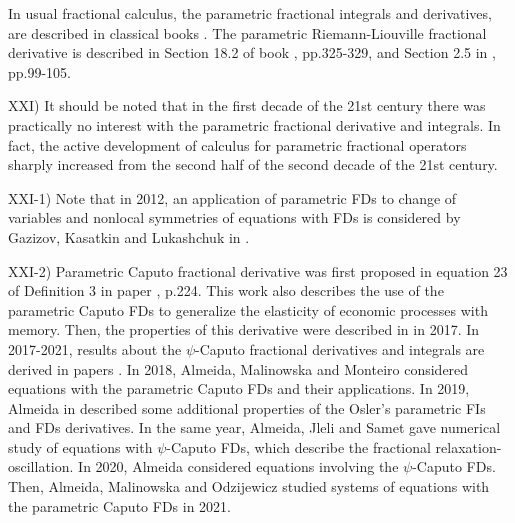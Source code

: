 \documentclass[12pt]{article}
\begin{document}

In usual fractional calculus, the parametric fractional integrals and derivatives, are described in classical books \cite{SKM,KST}.
The parametric Riemann-Liouville fractional derivative is described in Section 18.2 of book \cite{SKM}, pp.325-329, and Section 2.5 in \cite{KST}, pp.99-105.


XXI) It should be noted that in the first decade of the 21st century there was practically no interest with the parametric fractional derivative and integrals. 
In fact, the active development of calculus for parametric fractional operators sharply increased from the second half of the second decade of the 21st century.

XXI-1) Note that in 2012, an application of parametric FDs to change of variables and nonlocal symmetries of equations with FDs is considered by Gazizov, Kasatkin and Lukashchuk in \cite{Gazizov2012}.




XXI-2) Parametric Caputo fractional derivative 
was first proposed in equation 23 of Definition 3 in paper
\cite{Elasticity1}, p.224.
This work also describes the use of the parametric Caputo FDs
to generalize the elasticity of economic processes with memory. 
Then, the properties of this derivative were described in \cite{Almeida-1} in 2017.
In 2017-2021, results about the $\psi$-Caputo fractional derivatives and integrals are derived in papers 
\cite{Almeida-1,Almeida-2,Almeida-3,Almeida-4,Almeida-5,Almeida-6}. 
In 2018, Almeida, Malinowska and Monteiro \cite{Almeida-2} considered equations with the parametric Caputo FDs and their applications. 
In 2019, Almeida in \cite{Almeida-3} described some additional properties of the Osler's parametric FIs and FDs derivatives.
In the same year, Almeida, Jleli and Samet \cite{Almeida-4} gave numerical study of equations with $\psi$-Caputo FDs, which describe the fractional relaxation-oscillation.
In 2020, Almeida \cite{Almeida-5} considered equations involving the $\psi$-Caputo FDs.
Then, Almeida, Malinowska and Odzijewicz \cite{Almeida-6} studied systems of equations with the parametric Caputo FDs in 2021.
\end{document}
